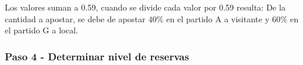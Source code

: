 \begin{table}[ht]
\centering
{}
\caption{Calculando la proporción del dinero que se debe invertir en estas apuestas}
\label{proporcion}
\end{table}


Los valores suman a 0.59, cuando se divide cada valor por 0.59 resulta: De la cantidad a apostar, se debe de apostar $40 \%$ en el partido A a visitante y $60 \%$ en el partido G a local.


\subsubsection{Paso 4 - Determinar nivel de reservas}
\label{sec:paso-4}

